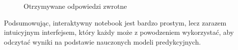 \begin{figure}[H]%
    \centering
    \qquad
    \caption{Otrzymywane odpowiedzi zwrotne}%
    \label{fig:Results}%
\end{figure}
Podsumowując, interaktywny notebook jest bardzo prostym, lecz zarazem intuicyjnym interfejsem, który każdy może z powodzeniem wykorzystać, aby odczytać wyniki na podstawie nauczonych modeli predykcyjnych.

\newpage\null\thispagestyle{empty}\newpage